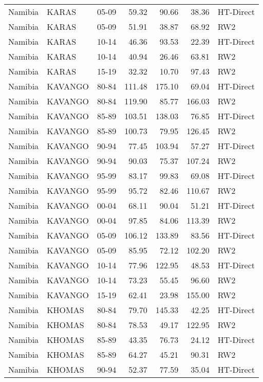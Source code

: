 \begin{longtable}{lllrrrl}
  Namibia & KARAS & 05-09 & 59.32 & 90.66 & 38.36 & HT-Direct \\ 
  Namibia & KARAS & 05-09 & 51.91 & 38.87 & 68.92 & RW2 \\ 
  Namibia & KARAS & 10-14 & 46.36 & 93.53 & 22.39 & HT-Direct \\ 
  Namibia & KARAS & 10-14 & 40.94 & 26.46 & 63.81 & RW2 \\ 
  Namibia & KARAS & 15-19 & 32.32 & 10.70 & 97.43 & RW2 \\ 
  Namibia & KAVANGO & 80-84 & 111.48 & 175.10 & 69.04 & HT-Direct \\ 
  Namibia & KAVANGO & 80-84 & 119.90 & 85.77 & 166.03 & RW2 \\ 
  Namibia & KAVANGO & 85-89 & 103.51 & 138.03 & 76.85 & HT-Direct \\ 
  Namibia & KAVANGO & 85-89 & 100.73 & 79.95 & 126.45 & RW2 \\ 
  Namibia & KAVANGO & 90-94 & 77.45 & 103.94 & 57.27 & HT-Direct \\ 
  Namibia & KAVANGO & 90-94 & 90.03 & 75.37 & 107.24 & RW2 \\ 
  Namibia & KAVANGO & 95-99 & 83.17 & 99.83 & 69.08 & HT-Direct \\ 
  Namibia & KAVANGO & 95-99 & 95.72 & 82.46 & 110.67 & RW2 \\ 
  Namibia & KAVANGO & 00-04 & 68.11 & 90.04 & 51.21 & HT-Direct \\ 
  Namibia & KAVANGO & 00-04 & 97.85 & 84.06 & 113.39 & RW2 \\ 
  Namibia & KAVANGO & 05-09 & 106.12 & 133.89 & 83.56 & HT-Direct \\ 
  Namibia & KAVANGO & 05-09 & 85.95 & 72.12 & 102.20 & RW2 \\ 
  Namibia & KAVANGO & 10-14 & 77.96 & 122.95 & 48.53 & HT-Direct \\ 
  Namibia & KAVANGO & 10-14 & 73.23 & 55.45 & 96.60 & RW2 \\ 
  Namibia & KAVANGO & 15-19 & 62.41 & 23.98 & 155.00 & RW2 \\ 
  Namibia & KHOMAS & 80-84 & 79.70 & 145.33 & 42.25 & HT-Direct \\ 
  Namibia & KHOMAS & 80-84 & 78.53 & 49.17 & 122.95 & RW2 \\ 
  Namibia & KHOMAS & 85-89 & 43.35 & 76.73 & 24.12 & HT-Direct \\ 
  Namibia & KHOMAS & 85-89 & 64.27 & 45.21 & 90.31 & RW2 \\ 
  Namibia & KHOMAS & 90-94 & 52.37 & 77.59 & 35.04 & HT-Direct \\ 

\end{longtable}
